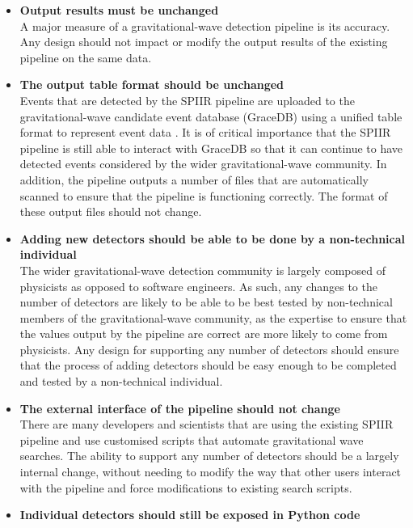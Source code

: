 \documentclass{article}
\begin{document}
\begin{itemize}
    \item \textbf{Output results must be unchanged}\\
        A major measure of a gravitational-wave detection pipeline is its accuracy.
        Any design should not impact or modify the output results of the existing pipeline on the same data.
    \item \textbf{The output table format should be unchanged}\\
        Events that are detected by the SPIIR pipeline are uploaded to the gravitational-wave candidate event database (GraceDB) using a unified table format to represent event data \cite{gracedb}.
        It is of critical importance that the SPIIR pipeline is still able to interact with GraceDB so that it can continue to have detected events considered by the wider gravitational-wave community.
        In addition, the pipeline outputs a number of files that are automatically scanned to ensure that the pipeline is functioning correctly.
        The format of these output files should not change.
    \item \textbf{Adding new detectors should be able to be done by a non-technical individual}\\
        The wider gravitational-wave detection community is largely composed of physicists as opposed to software engineers.
        As such, any changes to the number of detectors are likely to be able to be best tested by non-technical members of the gravitational-wave community, as the expertise to ensure that the values output by the pipeline are correct are more likely to come from physicists.
        Any design for supporting any number of detectors should ensure that the process of adding detectors should be easy enough to be completed and tested by a non-technical individual.
    \item \textbf{The external interface of the pipeline should not change}\\
        There are many developers and scientists that are using the existing SPIIR pipeline and use customised scripts that automate gravitational wave searches.
        The ability to support any number of detectors should be a largely internal change, without needing to modify the way that other users interact with the pipeline and force modifications to existing search scripts.
    \item \textbf{Individual detectors should still be exposed in Python code}\\

\end{itemize}
\end{document}

